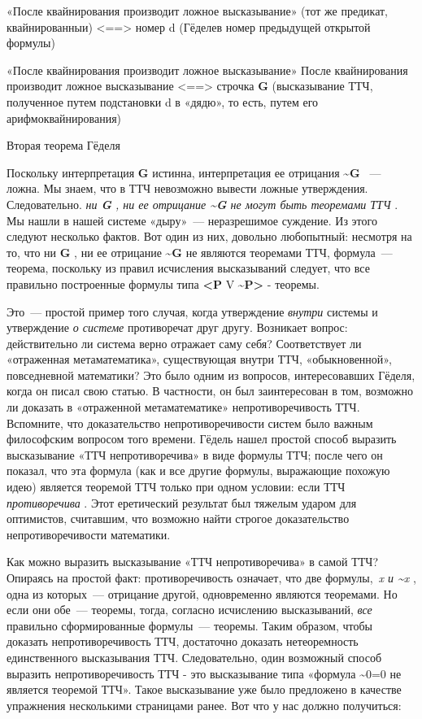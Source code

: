 \documentclass[../main.tex]{subfiles}
\begin{document}
«После квайнирования производит ложное высказывание» (тот же предикат, квайнированныи) \textless==\textgreater{} номер d (Гёделев номер предыдущей открытой формулы)

«После квайнирования производит ложное высказывание» После квайнирования производит ложное высказывание \textless==\textgreater{} строчка \textbf{G} (высказывание ТТЧ, полученное путем подстановки d в «дядю», то есть, путем его арифмоквайнирования)

Вторая теорема Гёделя

Поскольку интерпретация \textbf{G} истинна, интерпретация ее отрицания \textbf{\textasciitilde G} ~--- ложна. Мы знаем, что в ТТЧ невозможно вывести ложные утверждения. Следовательно. \emph{ни \textbf{G} , ни ее отрицание \textbf{\textasciitilde G} не могут быть теоремами ТТЧ} . Мы нашли в нашей системе «дыру»~--- неразрешимое суждение. Из этого следуют несколько фактов. Вот один из них, довольно любопытный: несмотря на то, что ни \textbf{G} , ни ее отрицание \textbf{\textasciitilde G} не являются теоремами ТТЧ, формула~--- теорема, поскольку из правил исчисления высказываний следует, что все правильно построенные формулы типа \textbf{\textless P} V \textbf{\textasciitilde P\textgreater{}} - теоремы.

Это~--- простой пример того случая, когда утверждение \emph{внутри} системы и утверждение \emph{о системе} противоречат друг другу. Возникает вопрос: действительно ли система верно отражает саму себя? Соответствует ли «отраженная метаматематика», существующая внутри ТТЧ, «обыкновенной», повседневной математики? Это было одним из вопросов, интересовавших Гёделя, когда он писал свою статью. В частности, он был заинтересован в том, возможно ли доказать в «отраженной метаматематике» непротиворечивость ТТЧ. Вспомните, что доказательство непротиворечивости систем было важным философским вопросом того времени. Гёдель нашел простой способ выразить высказывание «ТТЧ непротиворечива» в виде формулы ТТЧ; после чего он показал, что эта формула (как и все другие формулы, выражающие похожую идею) является теоремой ТТЧ только при одном условии: если ТТЧ \emph{противоречива} . Этот еретический результат был тяжелым ударом для оптимистов, считавшим, что возможно найти строгое доказательство непротиворечивости математики.

Как можно выразить высказывание «ТТЧ непротиворечива» в самой ТТЧ? Опираясь на простой факт: противоречивость означает, что две формулы,~\emph{x и \textasciitilde x} , одна из которых~--- отрицание другой, одновременно являются теоремами. Но если они обе~--- теоремы, тогда, согласно исчислению высказываний, \emph{все} правильно сформированные формулы~--- теоремы. Таким образом, чтобы доказать непротиворечивость ТТЧ, достаточно доказать нетеоремность единственного высказывания ТТЧ. Следовательно, один возможный способ выразить непротиворечивость ТТЧ - это высказывание типа «формула \textasciitilde0=0 не является теоремой ТТЧ». Такое высказывание уже было предложено в качестве упражнения несколькими страницами ранее. Вот что у нас должно получиться:
\end{document}
